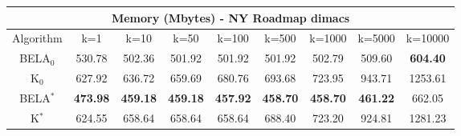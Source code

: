 \begin{tabular}{c|cccccccc}\toprule
\multicolumn{9}{c}{Memory (Mbytes) - NY Roadmap dimacs}\\ \midrule
Algorithm & k=1 & k=10 & k=50 & k=100 & k=500 & k=1000 & k=5000 & k=10000 \\ \midrule
BELA$_0$ & 530.78 & 502.36 & 501.92 & 501.92 & 501.92 & 502.79 & 509.60 & \textbf{604.40} \\
K$_0$ & 627.92 & 636.72 & 659.69 & 680.76 & 693.68 & 723.95 & 943.71 & 1253.61 \\
BELA$^*$ & \textbf{473.98} & \textbf{459.18} & \textbf{459.18} & \textbf{457.92} & \textbf{458.70} & \textbf{458.70} & \textbf{461.22} & 662.05 \\
K$^*$ & 624.55 & 658.64 & 658.64 & 658.64 & 688.40 & 723.20 & 924.81 & 1281.23 \\ \bottomrule 
\end{tabular}
